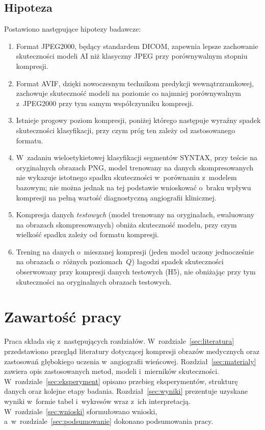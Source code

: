 \documentclass[12pt,a4paper]{article}
\begin{document}
\subsection{Hipoteza}
Postawiono następujące hipotezy badawcze:
\begin{enumerate}
    \item[H1:] Format JPEG2000, będący standardem DICOM, zapewnia lepsze zachowanie skuteczności modeli AI niż klasyczny JPEG przy porównywalnym stopniu kompresji.
    \item[H2:] Format AVIF, dzięki nowoczesnym technikom predykcji wewnątrzramkowej, zachowuje skuteczność modeli na poziomie co najmniej porównywalnym z~JPEG2000 przy tym samym współczynniku kompresji.
    \item[H3:] Istnieje progowy poziom kompresji, poniżej którego następuje wyraźny spadek skuteczności klasyfikacji, przy czym próg ten zależy od zastosowanego formatu.
    \item[H4:] W~zadaniu wieloetykietowej klasyfikacji segmentów SYNTAX, przy teście na oryginalnych obrazach PNG, model trenowany na danych skompresowanych nie wykazuje istotnego spadku skuteczności w~porównaniu z~modelem bazowym; nie można jednak na tej podstawie wnioskować o~braku wpływu kompresji na pełną wartość diagnostyczną angiografii klinicznej.
    \item[H5:] Kompresja danych \emph{testowych} (model trenowany na oryginałach, ewaluowany na obrazach skompresowanych) obniża skuteczność modelu, przy czym wielkość spadku zależy od formatu kompresji.
    \item[H6:] Trening na danych o~mieszanej kompresji (jeden model uczony jednocześnie na obrazach o~różnych poziomach~$Q$) łagodzi spadek skuteczności obserwowany przy kompresji danych testowych (H5), nie obniżając przy tym skuteczności na oryginalnych obrazach testowych.
\end{enumerate}

\clearpage
\section{Zawartość pracy}

Praca składa się z~następujących rozdziałów. W~rozdziale~\ref{sec:literatura} przedstawiono przegląd literatury dotyczącej kompresji obrazów medycznych oraz zastosowań głębokiego uczenia w~angiografii wieńcowej. Rozdział~\ref{sec:materialy} zawiera opis zastosowanych metod, modeli i~mierników skuteczności. W~rozdziale~\ref{sec:eksperyment} opisano przebieg eksperymentów, strukturę danych oraz kolejne etapy badania. Rozdział~\ref{sec:wyniki} prezentuje uzyskane wyniki w~formie tabel i~wykresów wraz z~ich interpretacją. W~rozdziale~\ref{sec:wnioski} sformułowano wnioski, a~w~rozdziale~\ref{sec:podsumowanie} dokonano podsumowania pracy.
\end{document}
